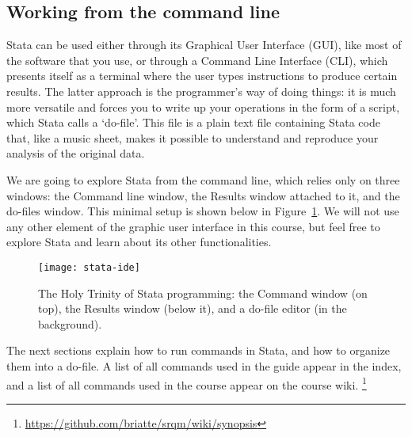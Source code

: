 \subsection{Working from the command line} %
	Stata can be used either through its Graphical User Interface (GUI), like most of the software that you use, or through a Command Line Interface (CLI), which presents itself as a terminal where the user types instructions to produce certain results. The latter approach is the programmer's way of doing things: it is much more versatile and forces you to write up your operations in the form of a script, which Stata calls a `do-file'. This file is a plain text file containing Stata code that, like a music sheet, makes it possible to understand and reproduce your analysis of the original data.%
	
	We are going to explore Stata from the command line, which relies only on three windows: the Command line window, the Results window attached to it, and the do-files window. This minimal setup is shown below in Figure~\ref{fig:stata-ide}. We will not use any other element of the graphic user interface in this course, but feel free to explore Stata and learn about its other functionalities.%
	
	\begin{figure}
		\texttt{[image: stata-ide]}%
		\caption{The Holy Trinity of Stata programming: the Command window (on top), the Results window (below it), and a do-file editor (in the background).}%
		\label{fig:stata-ide}%
	\end{figure}



	The next sections explain how to run commands in Stata, and how to organize them into a do-file. A list of all commands used in the guide appear in the index, and a list of all commands used in the course appear on the course wiki.%
		\footnote{\url{https://github.com/briatte/srqm/wiki/synopsis}}%

